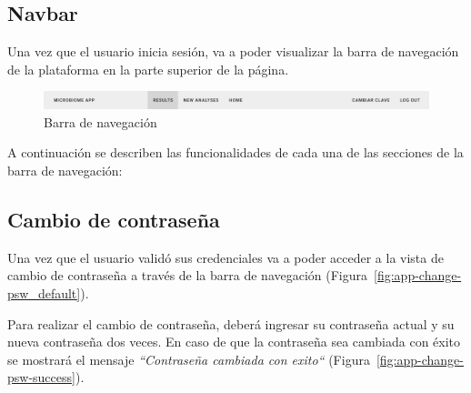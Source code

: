 \subsection{Navbar}
Una vez que el usuario inicia sesión, va a poder visualizar la barra de navegación de la plataforma en la parte superior de la página. 
\begin{figure}[H]
    \includegraphics[width=1\linewidth]{images/app/navbar.png}
    \caption{Barra de navegación}
    \label{fig:app-nabvar}
\end{figure}

A continuación se describen las funcionalidades de cada una de las secciones de la barra de navegación:

\subsection{Cambio de contraseña}
Una vez que el usuario validó sus credenciales va a poder acceder a la vista de cambio de contraseña a través de la barra de navegación (Figura~\ref{fig:app-change-psw_default}).



Para realizar el cambio de contraseña, deberá ingresar su contraseña actual y su nueva contraseña dos veces.
En caso de que la contraseña sea cambiada con éxito se mostrará el mensaje \textit{“Contraseña cambiada con exito“} (Figura~\ref{fig:app-change-psw-success}).


